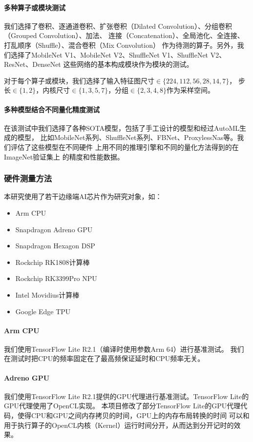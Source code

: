\paragraph{多种算子或模块测试}
我们选择了卷积、逐通道卷积、扩张卷积（Dilated Convolution）、分组卷积（Grouped Convolution）、加法、
连接（Concatenation）、全局池化、全连接、打乱顺序（Shuffle）、混合卷积（Mix Convolution\cite{tan2019mixconv}）
作为待测的算子。另外，我们选择了MobileNet V1、MobileNet V2、ShuffleNet V1、ShuffleNet V2、ResNet、DenseNet
这些网络的基本构成模块作为模块的测试。

对于每个算子或模块，我们选择了输入特征图尺寸$\in \{224,112,56,28,14,7\}$，
步长$\in \{1,2\}$，内核尺寸$\in \{1,3,5,7\}$，分组$\in \{2,3,4,8\}$作为采样空间。

\paragraph{多种模型结合不同量化精度测试}
在该测试中我们选择了各种SOTA模型，包括了手工设计的模型和经过AutoML生成的模型，
比如MobileNet系列、ShuffleNet系列、FBNet、ProxylessNas等。我们评估了这些模型在不同硬件
上用不同的推理引擎和不同的量化方法得到的在ImageNet\cite{deng2009imagenet}验证集上
的精度和性能数据。

\subsubsection{硬件测量方法}
本研究使用了若干边缘端AI芯片作为研究对象，如：
\begin{itemize}
    \item Arm CPU
    \item Snapdragon Adreno GPU
    \item Snapdragon Hexagon DSP
    \item Rockchip RK1808计算棒
    \item Rockchip RK3399Pro NPU
    \item Intel Movidius计算棒
    \item Google Edge TPU
\end{itemize}

\paragraph{Arm CPU}
我们使用TensorFlow Lite R2.1（编译时使用参数Arm 64）进行基准测试。
我们在测试时把CPU的频率固定在了最高频保证延时和CPU频率无关。

\paragraph{Adreno GPU}
我们使用TensorFlow Lite R2.1提供的GPU代理进行基准测试。TensorFlow Lite的GPU代理使用了OpenCL实现。
本项目修改了部分TensorFlow Lite的GPU代理代码，使得CPU和GPU之间内存拷贝的时间，GPU上的内存布局转换的时间
可以和用于执行算子的OpenCL内核（Kernel）运行时间分开，从而达到分开记时的效果。

